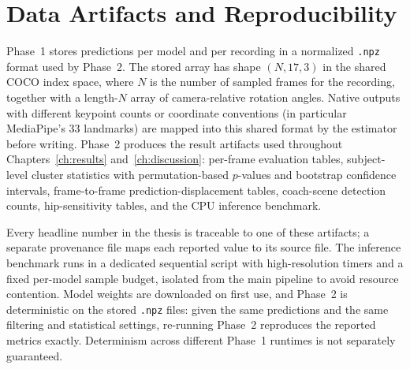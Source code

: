 \section{Data Artifacts and Reproducibility}
\label{sec:data-flow}

Phase~1 stores predictions per model and per recording in a normalized \texttt{.npz} format used by Phase~2. The stored array has shape $(N, 17, 3)$ in the shared COCO index space, where $N$ is the number of sampled frames for the recording, together with a length-$N$ array of camera-relative rotation angles. Native outputs with different keypoint counts or coordinate conventions (in particular MediaPipe's 33 landmarks) are mapped into this shared format by the estimator before writing. Phase~2 produces the result artifacts used throughout Chapters~\ref{ch:results} and~\ref{ch:discussion}: per-frame evaluation tables, subject-level cluster statistics with permutation-based $p$-values and bootstrap confidence intervals, frame-to-frame prediction-displacement tables, coach-scene detection counts, hip-sensitivity tables, and the CPU inference benchmark.

Every headline number in the thesis is traceable to one of these artifacts; a separate provenance file maps each reported value to its source file. The inference benchmark runs in a dedicated sequential script with high-resolution timers and a fixed per-model sample budget, isolated from the main pipeline to avoid resource contention. Model weights are downloaded on first use, and Phase~2 is deterministic on the stored \texttt{.npz} files: given the same predictions and the same filtering and statistical settings, re-running Phase~2 reproduces the reported metrics exactly. Determinism across different Phase~1 runtimes is not separately guaranteed.
